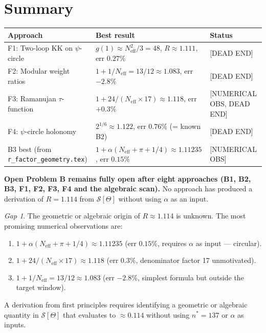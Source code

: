 \documentclass[11pt,a4paper]{article}
\theoremstyle{remark}
\newtheorem{gap}{Gap}
\begin{document}
\section{Summary}
\label{sec:r_new_summary}

\begin{center}
\begin{tabular}{lll}
  \toprule
  Approach & Best result & Status \\
  \midrule
  F1: Two-loop KK on $\psi$-circle
    & $g(1) \approx N_{\mathrm{eff}}^2/3 = 48$, $R \approx 1.111$, err $0.27\%$
    & [DEAD END] \\
  F2: Modular weight ratios
    & $1 + 1/N_{\mathrm{eff}} = 13/12 \approx 1.083$, err $-2.8\%$
    & [DEAD END] \\
  F3: Ramanujan $\tau$-function
    & $1 + 24/(N_{\mathrm{eff}} \times 17) \approx 1.118$, err $+0.3\%$
    & [NUMERICAL OBS, DEAD END] \\
  F4: $\psi$-circle holonomy
    & $2^{1/6} \approx 1.122$, err $0.76\%$ (= known B2)
    & [DEAD END] \\
  \midrule
  B3 best (from \texttt{r\_factor\_geometry.tex})
    & $1 + \alpha(N_{\mathrm{eff}} + \pi + 1/4) \approx 1.11235$, err $0.15\%$
    & [NUMERICAL OBS] \\
  \bottomrule
\end{tabular}
\end{center}

\textbf{Open Problem B remains fully open after eight approaches (B1, B2, B3,
F1, F2, F3, F4 and the algebraic scan).}  No approach has produced a derivation
of $R = 1.114$ from $\mathcal{S}[\Theta]$ without using $\alpha$ as an input.

\begin{gap}
  The geometric or algebraic origin of $R \approx 1.114$ is unknown.
  The most promising numerical observations are:
  \begin{enumerate}
    \item $1 + \alpha(N_{\mathrm{eff}} + \pi + 1/4) \approx 1.11235$ (err $0.15\%$,
          requires $\alpha$ as input — circular).
    \item $1 + 24/(N_{\mathrm{eff}} \times 17) \approx 1.118$ (err $0.3\%$,
          denominator factor 17 unmotivated).
    \item $1 + 1/N_{\mathrm{eff}} = 13/12 \approx 1.083$ (err $-2.8\%$,
          simplest formula but outside the target window).
  \end{enumerate}
  A derivation from first principles requires identifying a geometric or
  algebraic quantity in $\mathcal{S}[\Theta]$ that evaluates to $\approx 0.114$
  without using $n^* = 137$ or $\alpha$ as inputs.
\end{gap}

\ifdefined\INCLUDEMODE\else
\end{document}
